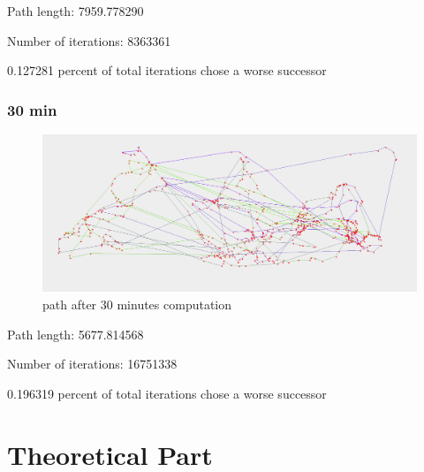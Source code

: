 \documentclass[paper=a4, fontsize=11pt]{scrartcl} %
\numberwithin{equation}{section} %
\numberwithin{figure}{section} %
\numberwithin{table}{section} %
\begin{document}
Path length: 7959.778290

Number of iterations: 8363361

0.127281 percent of total iterations chose a worse successor

\subsubsection{30 min}

\begin{figure}[h]
\includegraphics[width=\textwidth]{30min.png}
\caption{path after 30 minutes computation}
\label{tenMin}
\end{figure}

Path length: 5677.814568

Number of iterations: 16751338

0.196319 percent of total iterations chose a worse successor


\section{Theoretical Part}
\end{document}
